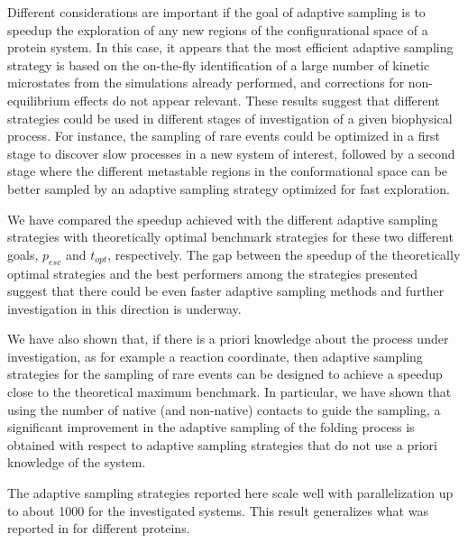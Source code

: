 Different considerations are important if the goal of adaptive sampling is to
speedup the exploration of any new regions of the configurational space of a
protein system. In this case, it appears that the most efficient adaptive
sampling strategy is based on the on-the-fly identification of a large number
of kinetic microstates from the simulations already performed, and corrections
for non-equilibrium effects do not appear relevant.
These results suggest that different strategies could be used in different
stages of investigation of a given biophysical process. For instance, the
sampling of rare events could be optimized in a first stage to discover slow
processes in a new system of interest, followed by a second stage where the
different metastable regions in the conformational space can be better sampled
by an adaptive sampling strategy optimized for fast exploration.

We have compared the speedup achieved with the different adaptive sampling
strategies with theoretically optimal benchmark strategies for these two
different goals, $p_{esc}$ and $t_{opt}$, respectively.  The gap between the
speedup of the theoretically optimal strategies and the best performers among
the strategies presented suggest that there could be even faster 
adaptive sampling methods and further investigation in this direction is underway.

We have also shown that, if there is a priori knowledge about the process
under investigation, as for example a reaction coordinate, then adaptive
sampling strategies for the sampling of rare events can be designed to achieve
a speedup close to the theoretical maximum benchmark. In particular, we have
shown that using the number of native (and non-native) contacts to guide the sampling, a
significant improvement in the adaptive sampling of the folding process is
obtained with respect to adaptive sampling strategies that do not use a priori
knowledge of the system.

The adaptive sampling strategies reported here scale well with parallelization
up to about 1000 for the investigated systems.  This result generalizes what
was reported in \cite{bowman2010enhanced} for different proteins. 

